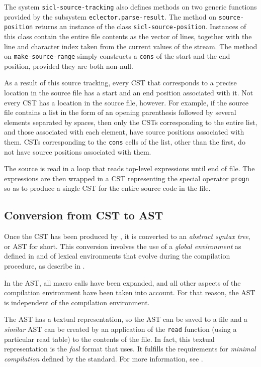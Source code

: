 The system \texttt{sicl-source-tracking} also defines methods on two
generic functions provided by the \eclector{} subsystem
\texttt{eclector.parse-result}.  The method on
\texttt{source-position} returns an instance of the class
\texttt{sicl-source-position}.  Instances of this class contain the
entire file contents as the vector of lines, together with the line
and character index taken from the current values of the stream.  The
method on \texttt{make-source-range} simply constructs a \texttt{cons}
of the start and the end position, provided they are both non-null.

As a result of this source tracking, every CST that corresponds to a
precise location in the source file has a start and an end position
associated with it.  Not every CST has a location in the source file,
however.  For example, if the source file contains a list in the form
of an opening parenthesis followed by several elements separated by
spaces, then only the CSTs corresponding to the entire list, and those
associated with each element, have source positions associated with
them.  CSTs corresponding to the \texttt{cons} cells of the list,
other than the first, do not have source positions associated with
them.

The source is read in a loop that reads top-level expressions until
end of file.  The expressions are then wrapped in a CST representing
the special operator \texttt{progn} so as to produce a single CST for
the entire source code in the file.

\subsection{Conversion from CST to AST}

Once the CST has been produced by \eclector{}, it is converted to an
\emph{abstract syntax tree}, or AST for short.  This conversion
involves the use of a \emph{global environment} as defined in
 and of lexical
environments that evolve during the compilation procedure, as describe
in .

In the AST, all macro calls have been expanded, and all other aspects
of the compilation environment have been taken into account.  For that
reason, the AST is independent of the compilation environment.

The AST has a textual representation, so the AST can be saved to a
file and a \emph{similar} AST can be created by an application of the
\texttt{read} function (using a particular read table) to the contents
of the file.  In fact, this textual representation is the \emph{fasl}
format that \sysname{} uses.  It fulfills the requirements for
\emph{minimal compilation} defined by the \commonlisp{} standard.
For more information, see .

